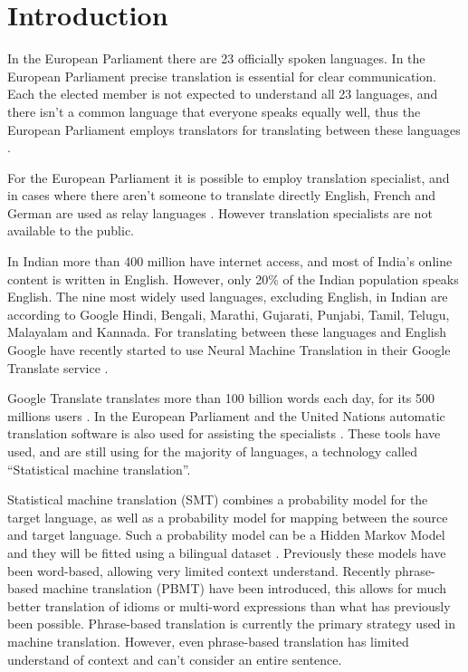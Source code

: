 \chapter{Introduction}

In the European Parliament there are 23 officially spoken languages. In the European Parliament precise translation is essential for clear communication. Each the elected member is not expected to understand all 23 languages, and there isn't a common language that everyone speaks equally well, thus the European Parliament employs translators for translating between these languages \cite{europarl-translation}.

For the European Parliament it is possible to employ translation specialist, and in cases where there aren't someone to translate directly English, French and German are used as relay languages \cite{europarl-translation}. However translation specialists are not available to the public.

In Indian more than 400 million have internet access, and most of India’s online content is written in English. However, only 20\% of the Indian population speaks English. The nine most widely used languages, excluding English, in Indian are according to Google Hindi, Bengali, Marathi, Gujarati, Punjabi, Tamil, Telugu, Malayalam and Kannada. For translating between these languages and English Google have recently started to use Neural Machine Translation in their Google Translate service \cite{google-translate-india}.

Google Translate translates more than 100 billion words each day, for its 500 millions users \cite{google-translate-stats}. In the European Parliament and the United Nations automatic translation software is also used for assisting the specialists \cite{europarl-translation}. These tools have used, and are still using for the majority of languages, a technology called ``Statistical machine translation''.

Statistical machine translation (SMT) combines a probability model for the target language, as well as a probability model for mapping between the source and target language. Such a probability model can be a Hidden Markov Model and they will be fitted using a bilingual dataset \cite{smt-comparetive-study}. Previously these models have been word-based, allowing very limited context understand. Recently phrase-based machine translation (PBMT) have been introduced, this allows for much better translation of idioms or multi-word expressions than what has previously been possible. Phrase-based translation is currently the primary strategy used in machine translation. However, even phrase-based translation has limited understand of context and can't consider an entire sentence.

